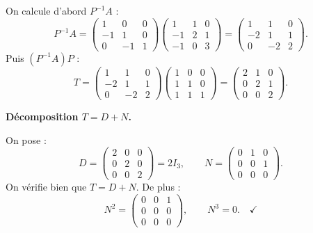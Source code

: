 {\begin{enumerate}
{    On calcule d'abord $P^{-1}A$ :
    \[
      P^{-1}A
      = \begin{pmatrix}1&0&0\\-1&1&0\\0&-1&1\end{pmatrix}
        \begin{pmatrix}1&1&0\\-1&2&1\\-1&0&3\end{pmatrix}
      = \begin{pmatrix}1&1&0\\-2&1&1\\0&-2&2\end{pmatrix}.
    \]
    Puis $(P^{-1}A)P$ :
    \[
      T = \begin{pmatrix}1&1&0\\-2&1&1\\0&-2&2\end{pmatrix}
          \begin{pmatrix}1&0&0\\1&1&0\\1&1&1\end{pmatrix}
        = \begin{pmatrix}2&1&0\\0&2&1\\0&0&2\end{pmatrix}.
    \]

    \textbf{Décomposition $T = D + N$.}

    On pose :
    \[
      D = \begin{pmatrix}2&0&0\\0&2&0\\0&0&2\end{pmatrix} = 2I_3,
      \qquad
      N = \begin{pmatrix}0&1&0\\0&0&1\\0&0&0\end{pmatrix}.
    \]
    On vérifie bien que $T = D + N$. De plus :
    \[
      N^2 = \begin{pmatrix}0&0&1\\0&0&0\\0&0&0\end{pmatrix},
      \qquad
      N^3 = 0. \quad\checkmark
    \]
  }

\end{enumerate}
}

